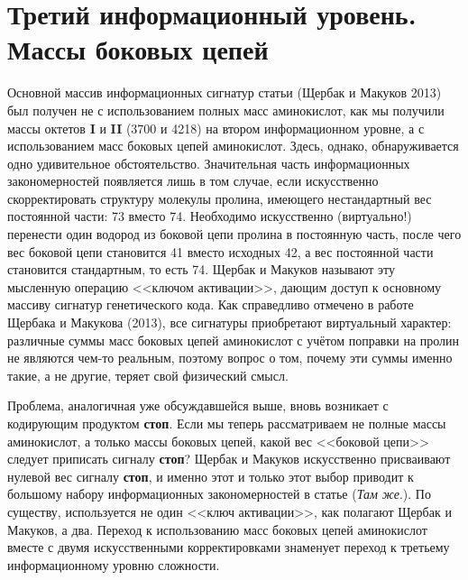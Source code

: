 \documentclass[12pt]{article}
\begin{document}
\section{Третий информационный уровень. Массы боковых цепей}

Основной массив информационных сигнатур статьи (Щербак и Макуков 2013) был получен не с использованием полных масс аминокислот, как мы получили массы октетов \textbf{I} и \textbf{II} (3700 и 4218) на втором информационном уровне, а с использованием масс боковых цепей аминокислот. Здесь, однако, обнаруживается одно удивительное обстоятельство. Значительная часть информационных закономерностей появляется лишь в том случае, если искусственно скорректировать структуру молекулы пролина, имеющего нестандартный вес постоянной части: 73 вместо 74. Необходимо искусственно (виртуально!) перенести один водород из боковой цепи пролина в постоянную часть, после чего вес боковой цепи становится 41 вместо исходных 42, а вес постоянной части становится стандартным, то есть 74. Щербак и Макуков называют эту мысленную операцию <<ключом активации>>, дающим доступ к основному массиву сигнатур генетического кода. Как справедливо отмечено в работе Щербака и Макукова (2013), все сигнатуры приобретают виртуальный характер: различные суммы масс боковых цепей аминокислот с учётом поправки на пролин не являются чем-то реальным, поэтому вопрос о том, почему эти суммы именно такие, а не другие, теряет свой физический смысл.

Проблема, аналогичная уже обсуждавшейся выше, вновь возникает с кодирующим продуктом \textbf{стоп}. Если мы теперь рассматриваем не полные массы аминокислот, а только массы боковых цепей, какой вес <<боковой цепи>> следует приписать сигналу \textbf{стоп}? Щербак и Макуков искусственно присваивают нулевой вес сигналу \textbf{стоп}, и именно этот и только этот выбор приводит к большому набору информационных закономерностей в статье (\textit{Там же}.). По существу, используется не один <<ключ активации>>, как полагают Щербак и Макуков, а два. Переход к использованию масс боковых цепей аминокислот вместе с двумя искусственными корректировками знаменует переход к третьему информационному уровню сложности.
\end{document}
